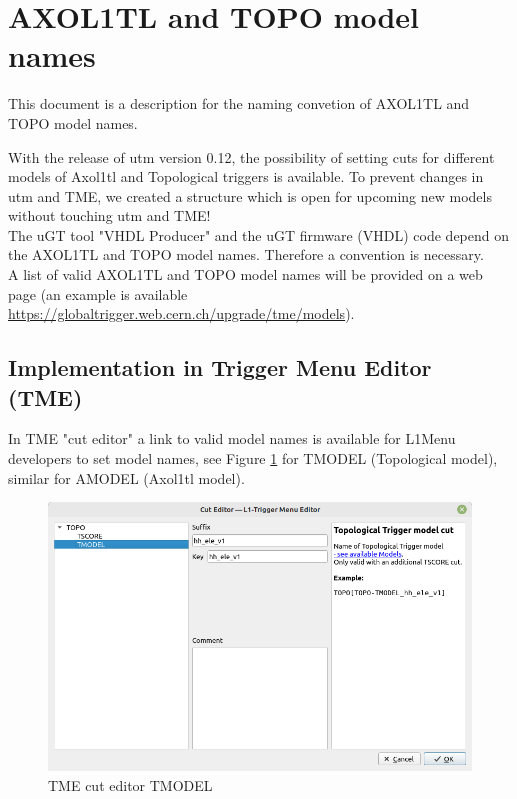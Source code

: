 
\section{AXOL1TL and TOPO model names}

This document is a description for the naming convetion of AXOL1TL and TOPO model names.

With the release of utm version 0.12, the possibility of setting cuts for different models of Axol1tl and Topological triggers is available.
To prevent changes in utm and TME, we created a structure which is open for upcoming new models without touching utm and TME!\\
The uGT tool "VHDL Producer" and the uGT firmware (VHDL) code depend on the AXOL1TL and TOPO model names. Therefore a convention is necessary.\\
A list of valid AXOL1TL and TOPO model names will be provided on a web page (an example is available \url{https://globaltrigger.web.cern.ch/upgrade/tme/models}).

\subsection{Implementation in Trigger Menu Editor (TME)}

In TME "cut editor" a link to valid model names is available for L1Menu developers to set model names, see Figure \ref{fig:tme_model_cut} for TMODEL (Topological model),
similar for AMODEL (Axol1tl model).

\begin{figure}[htb]
\centering
\includegraphics[width=15cm]{figures/tme_model_cut}
\caption{TME cut editor TMODEL}
\label{fig:tme_model_cut}
\end{figure}


